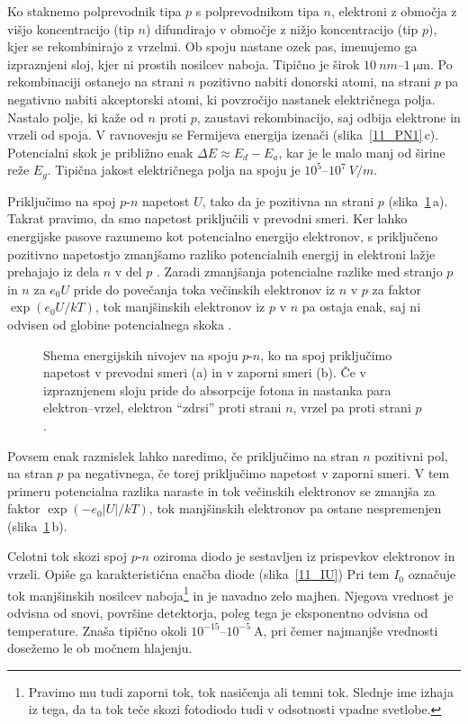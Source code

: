 Ko staknemo polprevodnik tipa $p$ s polprevodnikom tipa $n$, elektroni 
z območja z višjo koncentracijo (tip $n$) difundirajo v območje z nižjo koncentracijo
(tip $p$), kjer se rekombinirajo z vrzelmi. 
Ob spoju nastane ozek pas, imenujemo ga izpraznjeni sloj, kjer ni  
prostih nosilcev naboja. Tipično je širok $10~\si{nm}$--$1~\si{\micro\metre}$.
Po rekombinaciji ostanejo na strani $n$ pozitivno nabiti donorski atomi, 
na strani $p$ pa negativno nabiti akceptorski atomi, ki povzročijo nastanek  
električnega polja. Nastalo polje, ki kaže od $n$ proti $p$, zaustavi rekombinacijo, saj odbija
elektrone in vrzeli od spoja. V ravnovesju se Fermijeva energija izenači (slika~\ref{11_PN1}\,c). 
Potencialni skok je približno enak $\Delta E \approx E_d-E_a$, kar je le malo manj od 
širine reže $E_g$. Tipična jakost električnega polja na spoju je $10^5$--$10^7~\si{V/m}$.

Priključimo na spoj $p$-$n$ napetost $U$, tako da je pozitivna na strani $p$ (slika~\ref{11_PNU}\,a). 
Takrat pravimo, da smo napetost priključili v prevodni smeri.
Ker lahko energijske pasove razumemo kot potencialno energijo elektronov, 
s priključeno pozitivno napetostjo zmanjšamo razliko potencialnih energij 
in elektroni lažje prehajajo iz dela $n$ v del $p$ . 
Zaradi zmanjšanja potencialne razlike med stranjo $p$ in $n$ za $e_0U$ pride do povečanja toka 
večinskih elektronov iz $n$ v $p$ za faktor $\exp(e_0 U/kT)$, tok manjšinskih elektronov
iz $p$ v $n$ pa ostaja enak, saj ni odvisen od globine potencialnega skoka 
. 
\begin{figure}[h]
\centering
\def\svgwidth{140truemm} 

\caption{Shema energijskih nivojev na spoju $p$-$n$, ko na spoj priključimo napetost
v prevodni smeri (a) in v zaporni smeri (b). Če v izpraznjenem sloju pride do absorpcije
fotona in nastanka para elektron--vrzel, elektron ``zdrsi'' proti strani $n$, vrzel pa proti
strani $p$.}
\label{11_PNU}
\end{figure}

Povsem enak razmislek lahko naredimo, če priključimo 
na stran $n$ pozitivni pol, na stran $p$ pa negativnega, če torej priključimo
napetost v zaporni smeri. V tem primeru potencialna razlika naraste in tok 
večinskih elektronov se zmanjša za faktor $\exp(-e_0 |U|/kT)$, tok 
manjšinskih elektronov pa ostane nespremenjen (slika~\ref{11_PNU}\,b).

Celotni tok skozi spoj $p$-$n$ oziroma diodo je sestavljen iz prispevkov elektronov in vrzeli. Opiše ga
karakteristična enačba diode (slika~\ref{11_IU})
Pri tem $I_0$ označuje tok manjšinskih nosilcev naboja\footnote{Pravimo
mu tudi zaporni tok, tok nasičenja ali temni tok. Slednje ime izhaja iz tega, da
ta tok teče skozi fotodiodo tudi v odsotnosti vpadne svetlobe.}
in je navadno zelo majhen. Njegova vrednost je odvisna od snovi, površine
detektorja, poleg tega je eksponentno odvisna od temperature. Znaša 
tipično okoli $10^{-15}$--$10^{-5}~\si{\ampere}$, pri čemer najmanjše
vrednosti dosežemo le ob močnem hlajenju. 

